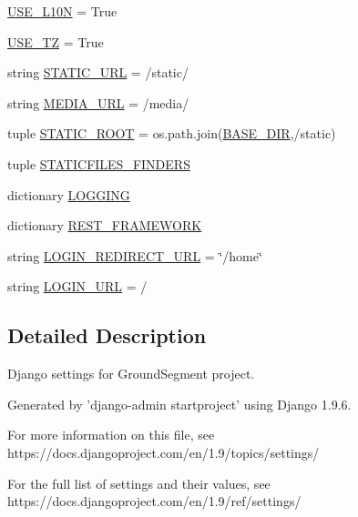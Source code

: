 \begin{DoxyCompactItemize}
\hyperlink{namespace_ground_segment_1_1settings_a8cf0ce46819ba284c86a1e87267378af}{U\+S\+E\+\_\+\+L10\+N} = True
\item 
\hyperlink{namespace_ground_segment_1_1settings_a1d9e63721f37542ce41c8145755c7d7e}{U\+S\+E\+\_\+\+T\+Z} = True
\item 
string \hyperlink{namespace_ground_segment_1_1settings_ae91e0e33f45cae10b6f1f4aef7862e1a}{S\+T\+A\+T\+I\+C\+\_\+\+U\+R\+L} = \textquotesingle{}/static/\textquotesingle{}
\item 
string \hyperlink{namespace_ground_segment_1_1settings_a482e3bb1fe2f21c677c69b69e5b5798a}{M\+E\+D\+I\+A\+\_\+\+U\+R\+L} = \textquotesingle{}/media/\textquotesingle{}
\item 
tuple \hyperlink{namespace_ground_segment_1_1settings_a99341177ff9700bce98aaa850c09412d}{S\+T\+A\+T\+I\+C\+\_\+\+R\+O\+O\+T} = os.\+path.\+join(\hyperlink{namespace_ground_segment_1_1settings_a96d9de6863371f2594631eee01ef0600}{B\+A\+S\+E\+\_\+\+D\+I\+R},\textquotesingle{}/static\textquotesingle{})
\item 
tuple \hyperlink{namespace_ground_segment_1_1settings_abf83e5e190e2a3cf3ae8d8bac305e750}{S\+T\+A\+T\+I\+C\+F\+I\+L\+E\+S\+\_\+\+F\+I\+N\+D\+E\+R\+S}
\item 
dictionary \hyperlink{namespace_ground_segment_1_1settings_ac72e34b0dd6d700d555daae97bae8118}{L\+O\+G\+G\+I\+N\+G}
\item 
dictionary \hyperlink{namespace_ground_segment_1_1settings_ab3c36c6cb632b928ebc77a83b13dbda9}{R\+E\+S\+T\+\_\+\+F\+R\+A\+M\+E\+W\+O\+R\+K}
\item 
string \hyperlink{namespace_ground_segment_1_1settings_a6d76611e9864bdae4f8766581d7accf7}{L\+O\+G\+I\+N\+\_\+\+R\+E\+D\+I\+R\+E\+C\+T\+\_\+\+U\+R\+L} = \char`\"{}/home\char`\"{}
\item 
string \hyperlink{namespace_ground_segment_1_1settings_a9f2c02d37399152c46ed216451c55f9d}{L\+O\+G\+I\+N\+\_\+\+U\+R\+L} = \textquotesingle{}/\textquotesingle{}
\end{DoxyCompactItemize}


\subsection{Detailed Description}
\begin{DoxyVerb}Django settings for GroundSegment project.

Generated by 'django-admin startproject' using Django 1.9.6.

For more information on this file, see
https://docs.djangoproject.com/en/1.9/topics/settings/

For the full list of settings and their values, see
https://docs.djangoproject.com/en/1.9/ref/settings/
\end{DoxyVerb}
 

